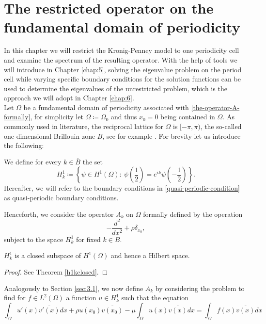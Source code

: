 \chapter{The restricted operator on the fundamental domain of periodicity}  \label{chap:4}

In this chapter we will restrict the Kronig-Penney model to one periodicity cell and examine the spectrum of the resulting operator. With the help of tools we will introduce in Chapter \ref{chap:5}, solving the eigenvalue problem on the period cell while varying specific boundary conditions for the solution functions can be used to determine the eigenvalues of the unrestricted problem, which is the approach we will adopt in Chapter \ref{chap:6}.
~\\ 

Let $\Omega$ be a fundamental domain of periodicity associated with \eqref{the-operator-A-formally}, for simplicity let $\Omega \coloneqq \Omega_{0}$ and thus $x_{0} = 0$ being contained in $\Omega$. As commonly used in literature, the reciprocal lattice for $\Omega$ is $[-\pi, \pi)$, the so-called one-dimensional Brillouin zone $B$, see for example \cite[Chapter 3]{dorfler2011photonic}. For brevity let us introduce the following:
\begin{definition} 
	We define for every $k \in \overline{B}$ the set  
	\begin{equation} 
		H^{1}_{k} \coloneqq \left\{ \psi \in H^{1}(\Omega): ~ \psi\left(\frac{1}{2}\right) = e^{ik} \psi\left(-\frac{1}{2}\right) \right\}. \label{quasi-periodic-condition}
	\end{equation}
	Hereafter, we will refer to the boundary conditions in \eqref{quasi-periodic-condition} as quasi-periodic boundary conditions.
\end{definition}
Henceforth, we consider the operator $A_{k}$ on $\Omega$ formally defined by the operation 
	\[ -\frac{d^{2}}{dx^{2}} + \rho \delta_{x_{0}}, \]
subject to the space $H^{1}_{k}$ for fixed $k \in \overline{B}$.
	
\begin{remark}
	$H^{1}_{k}$ is a closed subspace of $H^{1}(\Omega)$ and hence a Hilbert space.
\end{remark}

\begin{proof}
	See Theorem \ref{h1kclosed}.
\end{proof}

Analogously to Section \ref{sec:3.1}, we now define $A_{k}$ by considering the problem to find for $f \in L^{2}(\Omega)$ a function $u \in H^{1}_{k}$ such that the equation
	\begin{equation}
		\int_{\Omega} u'(x) \overline{v'(x)} dx + \rho u(x_{0}) \overline{v(x_{0})} - \mu \int_{\Omega} u(x) \overline{v(x)} dx = \int_{\Omega} f(x) \overline{v(x)} dx \label{weak-formulation-to-the-restricted}
	\end{equation}

